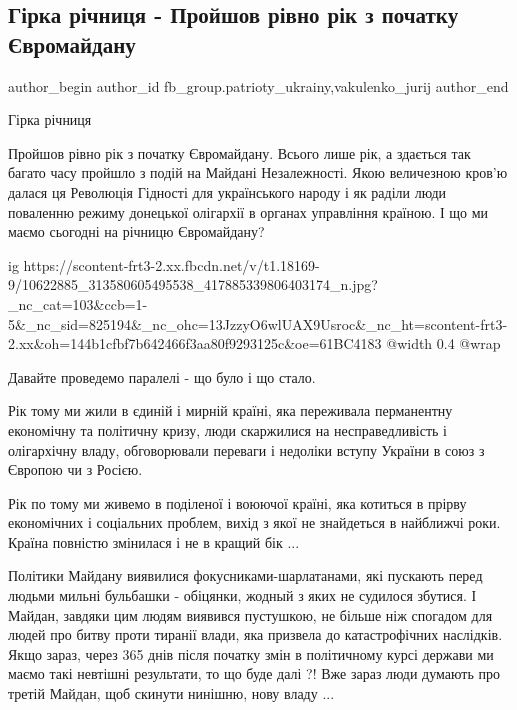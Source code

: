  
 
 
 
 
 
\subsection{Гірка річниця - Пройшов рівно рік з початку Євромайдану}
\label{sec:21_11_2014.fb.fb_group.patrioty_ukrainy.1.godovschina_evromaidan}
 
\ifcmt
 author_begin
   author_id fb_group.patrioty_ukrainy,vakulenko_jurij
 author_end
\fi

Гірка річниця

Пройшов рівно рік з початку Євромайдану. Всього лише рік, а здається так багато
часу пройшло з подій на Майдані Незалежності. Якою величезною кров'ю далася ця
Революція Гідності для українського народу і як раділи люди поваленню режиму
донецької олігархії в органах управління країною. І що ми маємо сьогодні на
річницю Євромайдану?

\ifcmt
  ig https://scontent-frt3-2.xx.fbcdn.net/v/t1.18169-9/10622885_313580605495538_417885339806403174_n.jpg?_nc_cat=103&ccb=1-5&_nc_sid=825194&_nc_ohc=13JzzyO6wlUAX9Usroc&_nc_ht=scontent-frt3-2.xx&oh=144b1cfbf7b642466f3aa80f9293125c&oe=61BC4183
  @width 0.4
  @wrap 
\fi

Давайте проведемо паралелі - що було і що стало.

Рік тому ми жили в єдиній і мирній країні, яка переживала перманентну
економічну та політичну кризу, люди скаржилися на несправедливість і
олігархічну владу, обговорювали переваги і недоліки вступу України в союз з
Європою чи з Росією.

Рік по тому ми живемо в поділеної і воюючої країні, яка котиться в прірву
економічних і соціальних проблем, вихід з якої не знайдеться в найближчі роки.
Країна повністю змінилася і не в кращий бік ...

Політики Майдану виявилися фокусниками-шарлатанами, які пускають перед людьми
мильні бульбашки - обіцянки, жодный з яких не судилося збутися. І Майдан,
завдяки цим людям виявився пустушкою, не більше ніж спогадом для людей про
битву проти тиранії влади, яка призвела до катастрофічних наслідків. Якщо
зараз, через 365 днів після початку змін в політичному курсі держави ми маємо
такі невтішні результати, то що буде далі ?! Вже зараз люди думають про третій
Майдан, щоб скинути нинішню, нову владу ...

